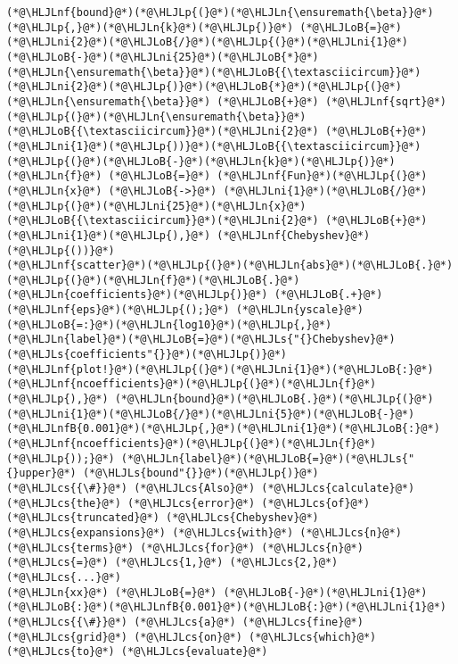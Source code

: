 \documentclass[12pt,landscape]{article}
\newcommand{\HLJLn}[1]{#1}
\newcommand{\HLJLnf}[1]{\textcolor[RGB]{66,102,213}{#1}}
\newcommand{\HLJLs}[1]{\textcolor[RGB]{201,61,57}{#1}}
\newcommand{\HLJLnfB}[1]{\textcolor[RGB]{59,151,46}{#1}}
\newcommand{\HLJLni}[1]{\textcolor[RGB]{59,151,46}{#1}}
\newcommand{\HLJLoB}[1]{\textcolor[RGB]{102,102,102}{\textbf{#1}}}
\newcommand{\HLJLp}[1]{#1}
\newcommand{\HLJLcs}[1]{\textcolor[RGB]{153,153,119}{\textit{#1}}}
\begin{document}
{\begin{lstlisting}
(*@\HLJLnf{bound}@*)(*@\HLJLp{(}@*)(*@\HLJLn{\ensuremath{\beta}}@*)(*@\HLJLp{,}@*)(*@\HLJLn{k}@*)(*@\HLJLp{)}@*) (*@\HLJLoB{=}@*) (*@\HLJLni{2}@*)(*@\HLJLoB{/}@*)(*@\HLJLp{(}@*)(*@\HLJLni{1}@*)(*@\HLJLoB{-}@*)(*@\HLJLni{25}@*)(*@\HLJLoB{*}@*)(*@\HLJLn{\ensuremath{\beta}}@*)(*@\HLJLoB{{\textasciicircum}}@*)(*@\HLJLni{2}@*)(*@\HLJLp{)}@*)(*@\HLJLoB{*}@*)(*@\HLJLp{(}@*)(*@\HLJLn{\ensuremath{\beta}}@*) (*@\HLJLoB{+}@*) (*@\HLJLnf{sqrt}@*)(*@\HLJLp{(}@*)(*@\HLJLn{\ensuremath{\beta}}@*)(*@\HLJLoB{{\textasciicircum}}@*)(*@\HLJLni{2}@*) (*@\HLJLoB{+}@*) (*@\HLJLni{1}@*)(*@\HLJLp{))}@*)(*@\HLJLoB{{\textasciicircum}}@*)(*@\HLJLp{(}@*)(*@\HLJLoB{-}@*)(*@\HLJLn{k}@*)(*@\HLJLp{)}@*)
(*@\HLJLn{f}@*) (*@\HLJLoB{=}@*) (*@\HLJLnf{Fun}@*)(*@\HLJLp{(}@*) (*@\HLJLn{x}@*) (*@\HLJLoB{->}@*) (*@\HLJLni{1}@*)(*@\HLJLoB{/}@*)(*@\HLJLp{(}@*)(*@\HLJLni{25}@*)(*@\HLJLn{x}@*)(*@\HLJLoB{{\textasciicircum}}@*)(*@\HLJLni{2}@*) (*@\HLJLoB{+}@*) (*@\HLJLni{1}@*)(*@\HLJLp{),}@*) (*@\HLJLnf{Chebyshev}@*)(*@\HLJLp{())}@*)
(*@\HLJLnf{scatter}@*)(*@\HLJLp{(}@*)(*@\HLJLn{abs}@*)(*@\HLJLoB{.}@*)(*@\HLJLp{(}@*)(*@\HLJLn{f}@*)(*@\HLJLoB{.}@*)(*@\HLJLn{coefficients}@*)(*@\HLJLp{)}@*) (*@\HLJLoB{.+}@*) (*@\HLJLnf{eps}@*)(*@\HLJLp{();}@*) (*@\HLJLn{yscale}@*)(*@\HLJLoB{=:}@*)(*@\HLJLn{log10}@*)(*@\HLJLp{,}@*) (*@\HLJLn{label}@*)(*@\HLJLoB{=}@*)(*@\HLJLs{"{}Chebyshev}@*) (*@\HLJLs{coefficients"{}}@*)(*@\HLJLp{)}@*)
(*@\HLJLnf{plot!}@*)(*@\HLJLp{(}@*)(*@\HLJLni{1}@*)(*@\HLJLoB{:}@*)(*@\HLJLnf{ncoefficients}@*)(*@\HLJLp{(}@*)(*@\HLJLn{f}@*)(*@\HLJLp{),}@*) (*@\HLJLn{bound}@*)(*@\HLJLoB{.}@*)(*@\HLJLp{(}@*)(*@\HLJLni{1}@*)(*@\HLJLoB{/}@*)(*@\HLJLni{5}@*)(*@\HLJLoB{-}@*)(*@\HLJLnfB{0.001}@*)(*@\HLJLp{,}@*)(*@\HLJLni{1}@*)(*@\HLJLoB{:}@*)(*@\HLJLnf{ncoefficients}@*)(*@\HLJLp{(}@*)(*@\HLJLn{f}@*)(*@\HLJLp{));}@*) (*@\HLJLn{label}@*)(*@\HLJLoB{=}@*)(*@\HLJLs{"{}upper}@*) (*@\HLJLs{bound"{}}@*)(*@\HLJLp{)}@*)
(*@\HLJLcs{{\#}}@*) (*@\HLJLcs{Also}@*) (*@\HLJLcs{calculate}@*) (*@\HLJLcs{the}@*) (*@\HLJLcs{error}@*) (*@\HLJLcs{of}@*) (*@\HLJLcs{truncated}@*) (*@\HLJLcs{Chebyshev}@*) (*@\HLJLcs{expansions}@*) (*@\HLJLcs{with}@*) (*@\HLJLcs{n}@*) (*@\HLJLcs{terms}@*) (*@\HLJLcs{for}@*) (*@\HLJLcs{n}@*) (*@\HLJLcs{=}@*) (*@\HLJLcs{1,}@*) (*@\HLJLcs{2,}@*) (*@\HLJLcs{...}@*)
(*@\HLJLn{xx}@*) (*@\HLJLoB{=}@*) (*@\HLJLoB{-}@*)(*@\HLJLni{1}@*)(*@\HLJLoB{:}@*)(*@\HLJLnfB{0.001}@*)(*@\HLJLoB{:}@*)(*@\HLJLni{1}@*) (*@\HLJLcs{{\#}}@*) (*@\HLJLcs{a}@*) (*@\HLJLcs{fine}@*) (*@\HLJLcs{grid}@*) (*@\HLJLcs{on}@*) (*@\HLJLcs{which}@*) (*@\HLJLcs{to}@*) (*@\HLJLcs{evaluate}@*)

\end{lstlisting}}
\end{document}
